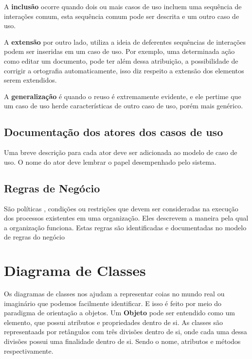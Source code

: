\documentclass[12pt a4paper]{paper}
\begin{document}
A \textbf{inclusão} ocorre quando dois ou mais casos de uso incluem uma sequência de 
interações comum, esta sequência comum pode ser descrita e um outro caso de uso. 

A \textbf{extensão} por outro lado, utiliza a ideia de deferentes sequências de 
interações podem ser inseridas em um caso de uso. Por exemplo, uma determinada ação 
como editar um documento, pode ter além dessa atribuição, a possibilidade de corrigir 
a ortografia automaticamente, isso diz respeito a extensão dos elementos serem 
extendidos.

A \textbf{generalização} é quando o reuso é extremamente evidente, e ele pertime que um 
caso de uso herde características de outro caso de uso, porém mais genérico.

\subsection{Documentação dos atores dos casos de uso} %
\label{sub:Documentação dos atores dos casos de uso}
Uma breve descrição para cada ator deve ser adicionada ao modelo de caso de uso. O nome 
do ator deve lembrar o papel desempenhado pelo sistema.

\subsection{Regras de Negócio} %
\label{sub:Regras de Negócio}
São políticas , condições ou restrições que devem ser consideradas na execução dos 
processos existentes em uma organização. Eles descrevem a maneira pela qual a 
organização funciona. Estas regras são identificadas e documentadas no modelo de 
regras do negócio

\section{Diagrama de Classes } %
\label{sec:Diagrama de Classes }
Os diagramas de classes nos ajudam a representar coias no mundo real ou imaginário que 
podemos facilmente identificar. E isso é feito por meio do paradigma de orientação a 
objetos. Um \textbf{Objeto} pode ser entendido como um elemento, que possui atributos 
e propriedades dentro de si. 
As classes são representaads por retângulos com três divisões dentro de si, onde cada 
uma dessa divisões possui uma finalidade dentro de si. Sendo o nome, atributos e 
métodos respectivamente.
\end{document}
